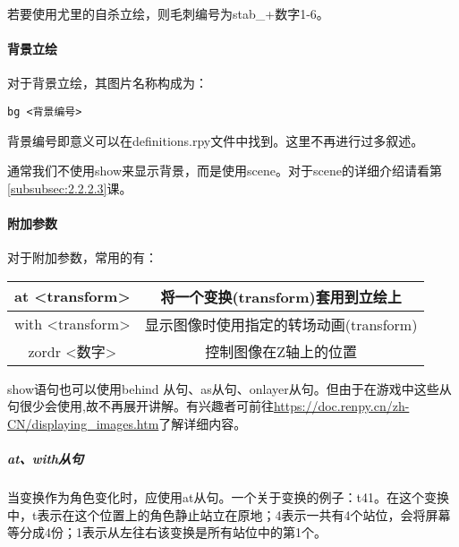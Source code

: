 若要使用尤里的自杀立绘，则毛刺编号为stab\_+数字1-6。

\paragraph{背景立绘}

对于背景立绘，其图片名称构成为：
\begin{lstlisting}
bg <背景编号>
\end{lstlisting}

背景编号即意义可以在definitions.rpy文件中找到。这里不再进行过多叙述。

\begin{ExtraKnowledge}
通常我们不使用show来显示背景，而是使用scene。对于scene的详细介绍请看第\ref{subsubsec:2.2.2.3}课。
\end{ExtraKnowledge}

\paragraph{附加参数}

对于附加参数，常用的有：
\begin{center}
    \tabletail{\hline}
    \tablelasttail{\hline}
    \begin{supertabular}{|c|c|}
        \hline
        at <transform> & 将一个变换(transform)套用到立绘上\\
        \hline
        with <transform> & 显示图像时使用指定的转场动画(transform)\\
        \hline
        zordr <数字> & 控制图像在Z轴上的位置\\
        \hline
    \end{supertabular}
\end{center}

\begin{ExtraKnowledge}
show语句也可以使用behind 从句、as从句、onlayer从句。但由于在游戏中这些从句很少会使用,故不再展开讲解。有兴趣者可前往\url{https://doc.renpy.cn/zh-CN/displaying_images.htm}了解详细内容。
\end{ExtraKnowledge}

\subparagraph{at、with从句}
\label{subsubsec:2.2.2.1}
当变换作为角色变化时，应使用at从句。一个关于变换的例子：t41。在这个变换中，t表示在这个位置上的角色静止站立在原地；4表示一共有4个站位，会将屏幕等分成4份；1表示从左往右该变换是所有站位中的第1个。

